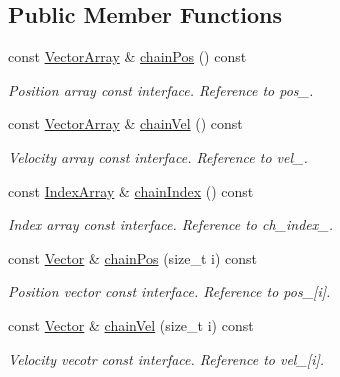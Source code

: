 \subsection*{Public Member Functions}
\begin{DoxyCompactItemize}
\item 
const \mbox{\hyperlink{class_vel_indep_particles_a27580f65b6523bfb6900520af2e44708}{Vector\+Array}} \& \mbox{\hyperlink{class_vel_indep_chain_particles_a77765235a45fd13ce74d69d1a1db1770}{chain\+Pos}} () const
\begin{DoxyCompactList}\small\item\em Position array const interface. Reference to pos\+\_\+. \end{DoxyCompactList}\item 
const \mbox{\hyperlink{class_vel_indep_particles_a27580f65b6523bfb6900520af2e44708}{Vector\+Array}} \& \mbox{\hyperlink{class_vel_indep_chain_particles_a22672cce6930aec1555f1f0662d0f52a}{chain\+Vel}} () const
\begin{DoxyCompactList}\small\item\em Velocity array const interface. Reference to vel\+\_\+. \end{DoxyCompactList}\item 
const \mbox{\hyperlink{class_vel_indep_chain_particles_a691749351fb710d16619ef6cc43bb1e6}{Index\+Array}} \& \mbox{\hyperlink{class_vel_indep_chain_particles_a0ad298c834406f31f95df62694d51869}{chain\+Index}} () const
\begin{DoxyCompactList}\small\item\em Index array const interface. Reference to ch\+\_\+index\+\_\+. \end{DoxyCompactList}\item 
const \mbox{\hyperlink{class_vel_indep_particles_aa7e03da81f44941c06abf43ec2180079}{Vector}} \& \mbox{\hyperlink{class_vel_indep_chain_particles_a245e69b858810e26e5ed61746694382e}{chain\+Pos}} (size\+\_\+t i) const
\begin{DoxyCompactList}\small\item\em Position vector const interface. Reference to pos\+\_\+\mbox{[}i\mbox{]}. \end{DoxyCompactList}\item 
const \mbox{\hyperlink{class_vel_indep_particles_aa7e03da81f44941c06abf43ec2180079}{Vector}} \& \mbox{\hyperlink{class_vel_indep_chain_particles_a81b2a3bd3f972dd11486beaafa6efc72}{chain\+Vel}} (size\+\_\+t i) const
\begin{DoxyCompactList}\small\item\em Velocity vecotr const interface. Reference to vel\+\_\+\mbox{[}i\mbox{]}. \end{DoxyCompactList}\item 

\end{DoxyCompactItemize}
